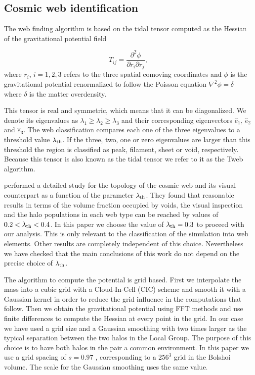 \documentclass{emulateapj}
\newcommand{\manuscript}{paper }
\newcommand{\hMpc}{{\ifmmode{h^{-1}{\rm Mpc}}\else{$h^{-1}$Mpc }\fi}}
\begin{document}
\subsection{Cosmic web identification}
The web finding algorithm is based on the tidal tensor computed as the
Hessian of the  gravitational potential field

\begin{equation}
T_{ij} = \frac{\partial^2 \phi}{\partial r_i \partial r_j}, 
\end{equation}
%
where $r_{i}$, $i=1,2,3$ refers to the three spatial comoving
coordinates and $\phi$ is the gravitational potential renormalized to
follow the Poisson equation $\nabla^2\phi=\delta$ where
$\delta$ is the matter overdensity.  

This tensor is real and symmetric, which means that it can be
diagonalized. 
We denote its eigenvalues as $\lambda_1\geq \lambda_2\geq
\lambda_3$ and their corresponding eigenvectors $\hat{e}_1$,
$\hat{e}_2$ and $\hat{e}_3$. 
The web classification compares each one
of the three eigenvalues to a threshold value $\lambda_{\rm th}$. 
If
the three, two, one or zero eigenvalues are larger than this threshold
the region is classified as peak, filament, sheet or void,
respectively.  Because this tensor is also known as the tidal tensor
we refer to it as the Tweb algorithm. 


\cite{Tweb} performed a detailed study for the topology of the
cosmic web and its visual counterpart as a function of the parameter
$\lambda_{\rm th}$. 
They found that reasonable results in terms of the
volume fraction occupied by voids, the visual inspection and the halo
populations in each web type can be reached by values of $0.2<\lambda_{\rm
th}<0.4$. 
In this \manuscript we choose the value of $\lambda_{\rm
  th}=0.3$ to proceed with our analysis. 
This is only relevant to the classification of the simulation into web
elements. Other results are completely independent of this
choice. Nevertheless we have checked that the main conclusions of this
work do not depend on the precise choice of $\lambda_{\rm th}$.


The algorithm to compute the potential is grid based. 
First we interpolate the mass into a cubic grid with a
Cloud-In-Cell (CIC) scheme and smooth it with a Gaussian kernel in order to reduce the grid influence in the computations that follow. 
Then we obtain the gravitational potential using FFT methods and use finite differences
to compute the Hessian at every point in the grid. 
In our case we have used a grid size and a Gaussian smoothing with
two times larger as the typical separation between the two halos in the Local Group. 
The purpose of this choice is to have both halos in the pair a common
environment. 
In this \manuscript we use a grid spacing of $s=0.97$ \hMpc,
corresponding to a $256^3$ grid in the Bolshoi volume. 
The scale for the Gaussian smoothing uses the same value. 
\end{document}
